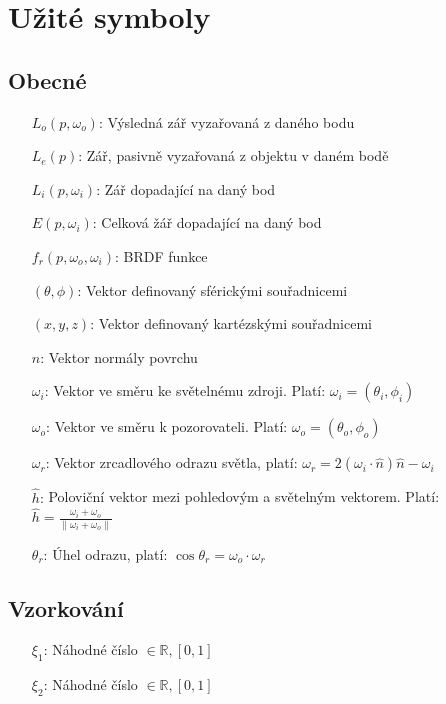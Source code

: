 \documentclass[czech,master,dept460,male,cpp,cpdeclaration]{diploma}
\newcommand{\interval}[1]{\left[{#1}\right]}
\newcommand{\uvec}[1]{\hat{#1}}
\newcommand{\point}{p}
\newcommand{\brdf}{f_r\left(\point,\omega_{o},\omega_{i}\right)}
\newcommand{\normVec}{\uvec{n}}
\newcommand{\inVec}{\omega_{i}}
\newcommand{\outVec}{\omega_{o}}
\newcommand{\refl}{\omega_{r}}
\newcommand{\halfVec}{\uvec{h}}
\newcommand{\outRadiance}{L_o \left( \point,\outVec \right)}
\newcommand{\inRadiance}{L_i \left( \point,\inVec \right)}
\newcommand{\emitRadiance}{L_e \left( \point \right)}
\newcommand{\irradiance}{E \left( \point, \inVec \right)}
\newcommand{\randU}{\xi_{1}}
\newcommand{\randV}{\xi_{2}}
\begin{document}
\printbibliography[title={Literatura}, heading=bibintoc]

\appendix
\section{Užité symboly}

\subsection{Obecné}

\begin{itemize}
    \item[\(\outRadiance\):] Výsledná zář vyzařovaná z daného bodu
    \item[\(\emitRadiance\):] Zář, pasivně vyzařovaná z objektu v daném bodě
    \item[\(\inRadiance\):] Zář dopadající na daný bod
    \item[\(\irradiance\):] Celková žář dopadající na daný bod
    \item[\(\brdf\):] BRDF funkce
    \item[\(\left(\theta,\phi\right)\):] Vektor definovaný sférickými souřadnicemi
    \item[\(\left(x,y,z\right)\):] Vektor definovaný kartézskými souřadnicemi
    \item[\(\normVec\):] Vektor normály povrchu
    \item[\(\inVec\):] Vektor ve směru ke světelnému zdroji. Platí: \(\inVec = \left(\theta_i,\phi_i\right)\)
    \item[\(\outVec\):] Vektor ve směru k pozorovateli. Platí: \(\outVec = \left(\theta_o,\phi_o\right)\)
    \item[\(\refl\):] Vektor zrcadlového odrazu světla, platí: \(\refl = 2\left(\inVec\cdot\normVec\right)\normVec-\inVec\)
    \item[\(\halfVec\):] Poloviční vektor mezi pohledovým a světelným vektorem. Platí: \(\halfVec = \frac{\inVec + \outVec}{\| \inVec + \outVec\|}\)
    \item[\(\theta_r\):] Úhel odrazu, platí: \(\cos\theta_r = \outVec\cdot\refl\)
\end{itemize}

\subsection{Vzorkování}

\begin{itemize}
    \item[\(\randU\):] Náhodné číslo $\in \mathbb{R}, \interval{0,1}$
    \item[\(\randV\):] Náhodné číslo $\in \mathbb{R}, \interval{0,1}$
\end{itemize}
\end{document}
